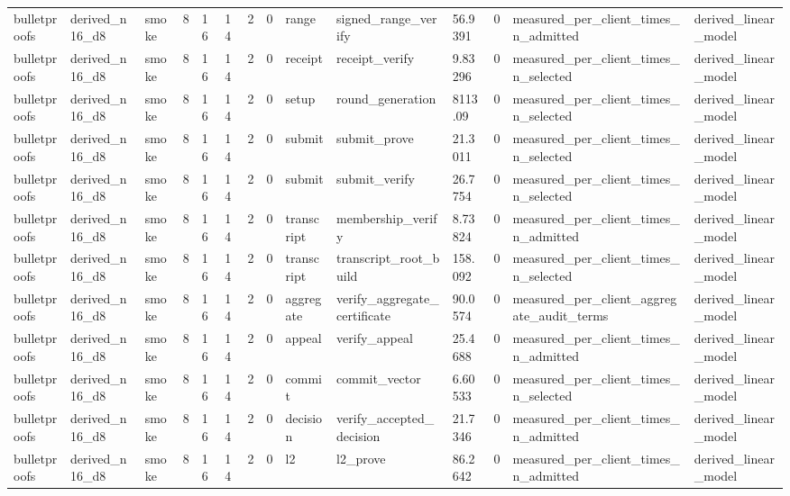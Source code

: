 \begin{table}[t]
\begin{tabular}{llllllllllllll}
bulletproofs & derived\_n16\_d8 & smoke & 8 & 16 & 14 & 2 & 0 & range & signed\_range\_verify & 56.9391 & 0 & measured\_per\_client\_times\_n\_admitted & derived\_linear\_model \\
bulletproofs & derived\_n16\_d8 & smoke & 8 & 16 & 14 & 2 & 0 & receipt & receipt\_verify & 9.83296 & 0 & measured\_per\_client\_times\_n\_selected & derived\_linear\_model \\
bulletproofs & derived\_n16\_d8 & smoke & 8 & 16 & 14 & 2 & 0 & setup & round\_generation & 8113.09 & 0 & measured\_per\_client\_times\_n\_selected & derived\_linear\_model \\
bulletproofs & derived\_n16\_d8 & smoke & 8 & 16 & 14 & 2 & 0 & submit & submit\_prove & 21.3011 & 0 & measured\_per\_client\_times\_n\_selected & derived\_linear\_model \\
bulletproofs & derived\_n16\_d8 & smoke & 8 & 16 & 14 & 2 & 0 & submit & submit\_verify & 26.7754 & 0 & measured\_per\_client\_times\_n\_selected & derived\_linear\_model \\
bulletproofs & derived\_n16\_d8 & smoke & 8 & 16 & 14 & 2 & 0 & transcript & membership\_verify & 8.73824 & 0 & measured\_per\_client\_times\_n\_admitted & derived\_linear\_model \\
bulletproofs & derived\_n16\_d8 & smoke & 8 & 16 & 14 & 2 & 0 & transcript & transcript\_root\_build & 158.092 & 0 & measured\_per\_client\_times\_n\_selected & derived\_linear\_model \\
bulletproofs & derived\_n16\_d8 & smoke & 8 & 16 & 14 & 2 & 0 & aggregate & verify\_aggregate\_certificate & 90.0574 & 0 & measured\_per\_client\_aggregate\_audit\_terms & derived\_linear\_model \\
bulletproofs & derived\_n16\_d8 & smoke & 8 & 16 & 14 & 2 & 0 & appeal & verify\_appeal & 25.4688 & 0 & measured\_per\_client\_times\_n\_admitted & derived\_linear\_model \\
bulletproofs & derived\_n16\_d8 & smoke & 8 & 16 & 14 & 2 & 0 & commit & commit\_vector & 6.60533 & 0 & measured\_per\_client\_times\_n\_selected & derived\_linear\_model \\
bulletproofs & derived\_n16\_d8 & smoke & 8 & 16 & 14 & 2 & 0 & decision & verify\_accepted\_decision & 21.7346 & 0 & measured\_per\_client\_times\_n\_admitted & derived\_linear\_model \\
bulletproofs & derived\_n16\_d8 & smoke & 8 & 16 & 14 & 2 & 0 & l2 & l2\_prove & 86.2642 & 0 & measured\_per\_client\_times\_n\_admitted & derived\_linear\_model \\

\end{tabular}
\end{table}
